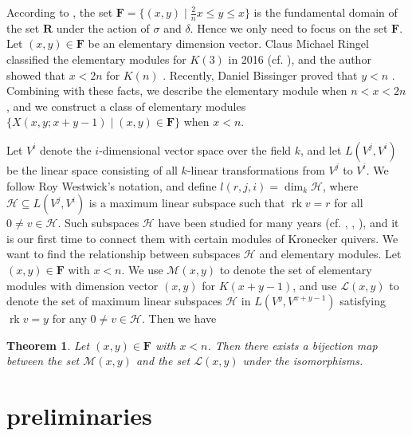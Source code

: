 \documentclass[a4paper,12pt]{amsart}
\newcommand{\cH}{\mathcal{H}}
\newcommand{\cL}{\mathcal{L}}
\newcommand{\cM}{\mathcal{M}}
\DeclareMathOperator{\rk}{rk}
\newtheorem{Theorem}[proposition]{Theorem}
\begin{document}
According to \cite{Daniel2}, the set $\mathbf{F}=\{(x,y)\mid \frac{2}{n}x\leq y\leq x\}$ is the fundamental domain of the set $\mathbf{R}$  under the action of $\sigma$ and $\delta$. Hence we only need to focus on the set $\mathbf{F}$.  Let $ (x,y)\in \mathbf{F}$ be an elementary dimension vector. Claus Michael Ringel classified the  elementary modules for $K(3)$ in 2016 (cf. \cite{Claus2}), and  the author  showed that $x<2n$ for $K(n)$ \cite[Lemma 3.6]{jie}. Recently, Daniel Bissinger proved that $y<n$ \cite[Proposition 3.4]{Daniel2}.  Combining with  these facts, we describe the elementary module when $n<x<2n$, and we construct  a class of elementary modules $\{X(x,y;x+y-1)\mid  (x,y)\in \mathbf{F}\}$ when $x<n$.  


Let  $V^i$ denote the $i$-dimensional vector space over the field $k$, and let $L(V^j,V^i)$ be the linear space consisting of all $k$-linear transformations from  $V^j$ to  $V^i$. We follow Roy Westwick's notation, and  define $l(r,j,i)=\dim_k \cH$, where  $\cH  \subseteq L(V^j,V^i)$ is  a maximum linear subspace such
that  $\rk v=r$ for all $0\neq v\in \cH$. Such subspaces $\cH$ have been studied for many years (cf. \cite{West}, \cite{john}, \cite{de}), and it is our first time to connect them with certain modules of Kronecker quivers. We want to find the relationship between subspaces $\cH$ and elementary modules. Let   $(x,y)\in \mathbf{F}$ with $x<n$. We use $\cM(x,y)$ to denote the set of elementary modules with dimension vector $(x,y)$ for $K(x+y-1)$, and use $\cL(x,y)$ to denote the set of maximum linear subspaces $\cH$ in $L(V^y, V^{x+y-1})$ satisfying $\rk v=y$ for any $0\neq v\in\cH$.  Then we have



 

\begin{Theorem}
Let   $(x,y)\in \mathbf{F}$ with $x<n$. Then there exists a bijection map between the set $\cM(x,y)$ and the set $\cL(x,y)$ under the isomorphisms.


  
\end{Theorem}












 


 \section{preliminaries}
 
\end{document}
